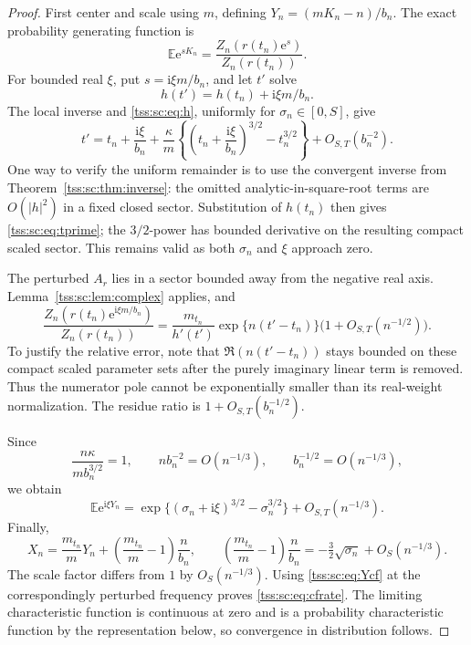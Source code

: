 \documentclass[11pt]{article}
\theoremstyle{remark}\newtheorem{remark}[theorem]{Remark}
\theoremstyle{definition}\newtheorem{definition}[theorem]{Definition}
\newcommand{\ii}{\mathrm i}
\newcommand{\e}{\mathrm e}
\newcommand{\E}{\mathbb E}
\begin{document}
\begin{proof}
First center and scale using $m$, defining $Y_n=(mK_n-n)/b_n$. The exact probability generating function is
\begin{equation}\label{tss:sc:eq:pgfK}
 \E\e^{sK_n}=\frac{Z_n(r(t_n)\e^s)}{Z_n(r(t_n))}.
\end{equation}
For bounded real $\xi$, put $s=\ii\xi m/b_n$, and let $t'$ solve
\[
 h(t')=h(t_n)+\ii\xi m/b_n.
\]
The local inverse and \eqref{tss:sc:eq:h}, uniformly for $\sigma_n\in[0,S]$, give
\begin{equation}\label{tss:sc:eq:tprime}
 t'=t_n+\frac{\ii\xi}{b_n}
 +\frac{\kappa}{m}\left\{\left(t_n+\frac{\ii\xi}{b_n}\right)^{3/2}
                         -t_n^{3/2}\right\}
 +O_{S,T}(b_n^{-2}).
\end{equation}
One way to verify the uniform remainder is to use the convergent inverse from Theorem~\ref{tss:sc:thm:inverse}: the omitted analytic-in-square-root terms are $O(|h|^2)$ in a fixed closed sector. Substitution of $h(t_n)$ then gives \eqref{tss:sc:eq:tprime}; the $3/2$-power has bounded derivative on the resulting compact scaled sector. This remains valid as both $\sigma_n$ and $\xi$ approach zero.

The perturbed $A_r$ lies in a sector bounded away from the negative real axis. Lemma~\ref{tss:sc:lem:complex} applies, and
\[
 \frac{Z_n(r(t_n)\e^{\ii\xi m/b_n})}{Z_n(r(t_n))}
 =\frac{m_{t_n}}{h'(t')}\exp\{n(t'-t_n)\}
   \bigl(1+O_{S,T}(n^{-1/2})\bigr).
\]
To justify the relative error, note that $\Re(n(t'-t_n))$ stays bounded on these compact scaled parameter sets after the purely imaginary linear term is removed. Thus the numerator pole cannot be exponentially smaller than its real-weight normalization. The residue ratio is $1+O_{S,T}(b_n^{-1/2})$.

Since
\[
 \frac{n\kappa}{m b_n^{3/2}}=1,\qquad
 nb_n^{-2}=O(n^{-1/3}),\qquad b_n^{-1/2}=O(n^{-1/3}),
\]
we obtain
\begin{equation}\label{tss:sc:eq:Ycf}
 \E\e^{\ii\xi Y_n}
 =\exp\{(\sigma_n+\ii\xi)^{3/2}-\sigma_n^{3/2}\}
       +O_{S,T}(n^{-1/3}).
\end{equation}
Finally,
\[
 X_n=\frac{m_{t_n}}mY_n
      +\left(\frac{m_{t_n}}m-1\right)\frac n{b_n},
\qquad
 \left(\frac{m_{t_n}}m-1\right)\frac n{b_n}
 =-\tfrac32\sqrt{\sigma_n}+O_S(n^{-1/3}).
\]
The scale factor differs from $1$ by $O_S(n^{-1/3})$. Using \eqref{tss:sc:eq:Ycf} at the correspondingly perturbed frequency proves \eqref{tss:sc:eq:cfrate}. The limiting characteristic function is continuous at zero and is a probability characteristic function by the representation below, so convergence in distribution follows.
\end{proof}
\end{document}
